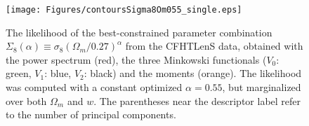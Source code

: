 \documentclass[reprint,aps,prd,superscriptaddress,showkeys,showpacs]{revtex4-1}
\begin{document}
\begin{figure}
\begin{center}
\texttt{[image: Figures/contoursSigma8Om055\_single.eps]}
\end{center}
\caption{The likelihood of the best-constrained parameter combination
  $\Sigma_8(\alpha)\equiv\sigma_8(\Omega_m/0.27)^\alpha$ from the
  CFHTLenS data, obtained with the power spectrum (red), the three
  Minkowski functionals ($V_0$: green, $V_1$: blue, $V_2$: black) and
  the moments (orange).
  The likelihood was computed with a constant optimized $\alpha=0.55$,
  but marginalized over both $\Omega_m$ and $w$. 
  The parentheses near the descriptor label refer to the number of
  principal components.}
\label{likelihoodSi8single}
\end{figure}
\end{document}

